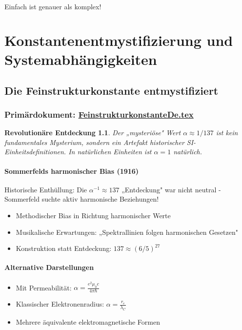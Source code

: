 \documentclass[12pt,a4paper]{report}
\newtheorem{discovery}{Revolutionäre Entdeckung}[chapter]
\begin{document}
	Einfach ist genauer als komplex!
	
	\chapter{Konstantenentmystifizierung und Systemabhängigkeiten}
	
	\section{Die Feinstrukturkonstante entmystifiziert}
	\subsection{Primärdokument: \href{https://github.com/jpascher/T0-Time-Mass-Duality/tree/main/2/pdf/FeinstrukturkonstanteDe.pdf}{FeinstrukturkonstanteDe.tex}}
	
	\begin{discovery}
		Der „mysteriöse" Wert $\alpha \approx 1/137$ ist kein fundamentales Mysterium, sondern ein Artefakt historischer SI-Einheitsdefinitionen. In natürlichen Einheiten ist $\alpha = 1$ natürlich.
	\end{discovery}
	
	\subsubsection{Sommerfelds harmonischer Bias (1916)}
	Historische Enthüllung: Die $\alpha^{-1} \approx 137$ „Entdeckung" war nicht neutral - 
	Sommerfeld suchte aktiv harmonische Beziehungen!
	\begin{itemize}
		\item Methodischer Bias in Richtung harmonischer Werte
		\item Musikalische Erwartungen: „Spektrallinien folgen harmonischen Gesetzen"
		\item Konstruktion statt Entdeckung: $137 \approx (6/5)^{27}$
	\end{itemize}
	
	\subsubsection{Alternative Darstellungen}
	\begin{itemize}
		\item Mit Permeabilität: $\alpha = \frac{e^2 \mu_0 c}{4\pi \hbar}$
		\item Klassischer Elektronenradius: $\alpha = \frac{r_e}{\lambda_C}$
		\item Mehrere äquivalente elektromagnetische Formen
	\end{itemize}
	
\end{document}
